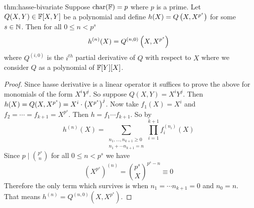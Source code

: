 \begin{theorem}{}{thm:hasse-bivariate}
  Suppose $\operatorname{char}(\mathbb{F})=p$ where $p$ is a prime. Let $Q(X,Y)\in\mathbb{F}[X,Y]$ be a polynomial and define $h(X)=Q\left(X,X^{p^s}\right)$ for some $s\in\mathbb{N}$. Then for all $0\leq n<p^s$ $$h^{(n)}(X)=Q^{(n,0)}\left(X,X^{p^s}\right)$$where $Q^{(i,0)}$ is the $i^{th}$ partial derivative of $Q$ with respect to $X$ where we consider $Q$ as a polynomial of $\mathbb{F}[Y][X]$.
\end{theorem}
\begin{proof}
  Since hasse derivative is a linear operator it suffices to prove the above for monomials of the form $X^iY^j$. So suppose $Q(X,Y)=X^iY^j$. Then $h(X)=Q(X,X^{p^s})=X^i\cdot \left(X^{p^s}\right)^j$. Now take $f_1(X)=X^i$ and $f_2=\cdots =f_{k+1}=X^{p^s}$. Then $h=f_1\cdots f_{k+1}$. So by  $$h^{(n)}(X)=\sum_{\substack{n_1,\dots, n_{k+1}\geq 0\\ n_1+\cdots n_{k+1}=n}}\prod_{i=1}^{k+1}f_i^{(n_i)}(X)$$Since $p\mid \binom{p^s}n$ for all $0\leq n<p^s$ we have $$(X^{p^s})^{(n)}=\binom{p^s}X^{p^s-n}\equiv 0$$Therefore the only term which survives is when $n_1=\cdots n_{k+1}=0$ and $n_0=n$. That means $h^{(n)}=Q^{(n,0)}(X,X^{p^s})$.
\end{proof}
